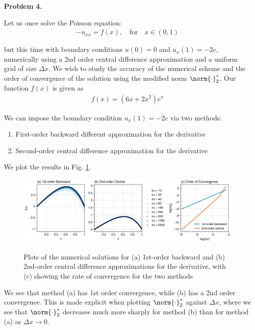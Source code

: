 \textbf{Problem 4.}

Let us once solve the Poisson equation:
\begin{align*}
    -u_{xx} = f(x), \quad \text{for} \quad x\in(0,1)
\end{align*}

but this time with boundary conditions $u(0)=0$ and $u_x(1) = -2e$, numerically using a 2nd order central difference approximation and a uniform grid of size $\Delta x$.  We wish to study the accuracy of the numerical scheme and the order of convergence of the solution using the modified norm $\norm{\cdot}_2^*$.  Our function $f(x)$ is given as
\begin{align*}
    f(x) = (6x + 2x^2)e^x
\end{align*}

We can impose the boundary condition $u_x(1) = -2e$ via two methods:
\begin{enumerate}[label=(\alph*),itemsep=0mm]
    
    \item First-order backward different approximation for the derivative
    \item Second-order central difference approximation for the derivative
    
\end{enumerate}

We plot the results in Fig. \ref{hw2_qn4}.

\begin{figure}[h!]
\centering
\includegraphics[width=\textwidth]{figures/hw2_qn4_numericalsol.png}\\
\caption{Plots of the numerical solutions for (a) 1st-order backward and (b) 2nd-order central difference approximations for the derivative, with (c) showing the rate of convergence for the two methods}
\label{hw2_qn4}
\end{figure}

We see that method (a) has 1st order convergence, while (b) has a 2nd order convergence.  This is made explicit when plotting $\norm{\cdot}_2^*$ against $\Delta x$, where we see that $\norm{\cdot}_2^*$ decreases much more sharply for method (b) than for method (a) as $\Delta x \rightarrow 0$.